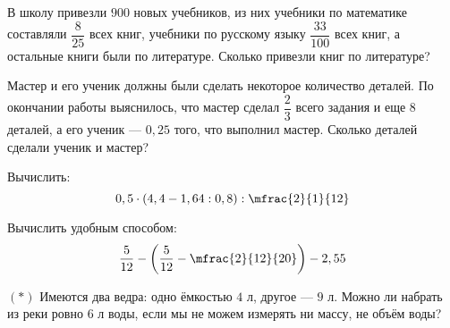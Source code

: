 \begin{homework}[number=3]
	\begin{listofex}
		\item В школу привезли \(900\) новых учебников, из них учебники по математике составляли \(\dfrac{8}{25}\) всех книг, учебники по русскому языку \(\dfrac{33}{100}\) всех книг, а остальные книги были по литературе. Сколько привезли книг по литературе?
		\item Мастер и его ученик должны были сделать некоторое количество деталей. По окончании работы выяснилось, что мастер сделал \(\dfrac{2}{3}\) всего задания и еще \(8\) деталей, а его ученик --- \(0,25\) того, что выполнил мастер. Сколько деталей сделали ученик и мастер?
		\item Вычислить: \[ 0,5 \cdot (4,4  - 1,64 : 0,8) : \mfrac{2}{1}{12} \]
		\item Вычислить удобным способом: \[ \dfrac{5}{12} - \left( \dfrac{5}{12} - \mfrac{2}{12}{20} \right) - 2,55 \]
		\item \(\left( * \right)\) Имеются два ведра: одно ёмкостью \(4\) л, другое --- \(9\) л. Можно ли набрать из реки ровно \(6\) л воды, если мы не можем измерять ни массу, не объём воды?
	\end{listofex}
\end{homework}

